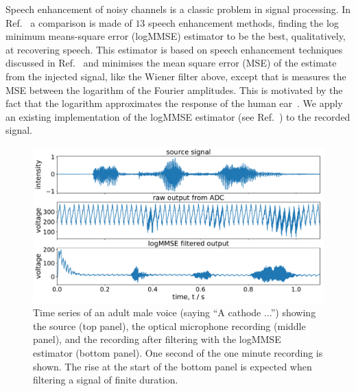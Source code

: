 \documentclass[paper-main.tex]{subfiles}
\begin{document}
Speech enhancement of noisy channels is a classic problem in signal processing. 
In Ref.~\cite{SubjectiveComparison} a comparison is made of $13$ speech enhancement methods, finding the log minimum means-square error (logMMSE) estimator to be the best, qualitatively, at recovering speech. 
This estimator is based on speech enhancement techniques discussed in Ref.~\cite{Ephraim1984SpeechEU_logMMSE} and minimises the mean square error (MSE) of the estimate from the injected signal, like the Wiener filter above, except that is measures the MSE between the logarithm of the Fourier amplitudes. This is motivated by the fact that the logarithm approximates the response of the human ear~\cite{SubjectiveComparison}. We apply an existing implementation of the logMMSE estimator (see Ref.~\cite{logmmse}) to the recorded signal.

 

\begin{figure}
	\includegraphics[width=\textwidth]{figures/combined_timeseries_melatos.pdf}
	\caption{Time series of an adult male voice (saying ``A cathode ...'') showing the source (top panel), the optical microphone recording (middle panel), and the recording after filtering with the logMMSE estimator (bottom panel). One second of the one minute recording is shown. The rise at the start of the bottom panel is expected when filtering a signal of finite duration.}
	\label{fig:logMMSE_timeseries}
\end{figure}
\end{document}
